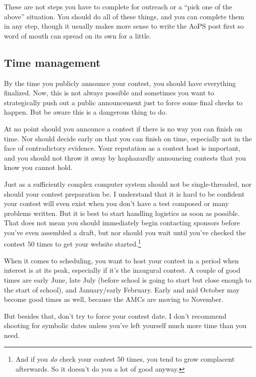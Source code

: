 \documentclass[points=false]{bounce}
\begin{document}
These are not steps you have to complete for outreach or a ``pick one of the above'' situation. You should do all of these things, and you can complete them in any step, though it usually makes more sense to write the AoPS post first so word of mouth can spread on its own for a little.

\subsection{Time management}

By the time you publicly announce your contest, you should have everything finalized. Now, this is not always possible and sometimes you want to strategically push out a public announcement just to force some final checks to happen. But be aware this is a dangerous thing to do.

At no point should you announce a contest if there is no way you can finish on time.
Nor should decide early on that you can finish on time, especially not in the face of contradictory evidence.
Your reputation as a contest host is important,
and you should not throw it away by haphazardly announcing contests that you know you cannot hold.

Just as a sufficiently complex computer system should not be single-threaded, nor should your contest preparation be. I understand that it is hard to be confident your contest will even exist when you don't have a test composed or many problems written. But it is best to start handling logistics as soon as possible. That does not mean you should immediately begin contacting sponsors before you've even assembled a draft, but nor should you wait until you've checked the contest $50$ times to get your website started.\footnote{And if you \emph{do} check your contest $50$ times, you tend to grow complacent afterwards. So it doesn't do you a lot of good anyway.}

When it comes to scheduling, you want to host your contest in a period when interest is at its peak, especially if it's the inaugural contest. A couple of good times are early June, late July (before school is going to start but close enough to the start of school), and January/early February. Early and mid October may become good times as well, because the AMCs are moving to November. 

But besides that, don't try to force your contest date. I don't recommend shooting for symbolic dates unless you've left yourself much more time than you need.
\end{document}
